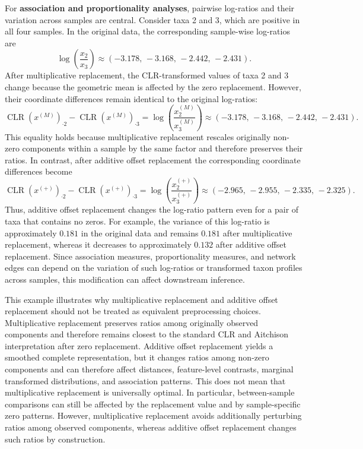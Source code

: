 For \textbf{association and proportionality analyses}, pairwise log-ratios and their variation across samples are central. Consider taxa 2 and 3, which are positive in all four samples. In the original data, the corresponding sample-wise log-ratios are
\begin{equation}
\log\left(\frac{x_2}{x_3}\right)
\approx
(-3.178,\,-3.168,\,-2.442,\,-2.431).
\label{eq:2micro:original_logratio_taxa23_example}
\end{equation}
After multiplicative replacement, the CLR-transformed values of taxa 2 and 3 change because the geometric mean is affected by the zero replacement. However, their coordinate differences remain identical to the original log-ratios:
\begin{equation}
\operatorname{CLR}(x^{(M)})_{\cdot 2}
-
\operatorname{CLR}(x^{(M)})_{\cdot 3}
=
\log\left(\frac{x_2^{(M)}}{x_3^{(M)}}\right)
\approx
(-3.178,\,-3.168,\,-2.442,\,-2.431).
\label{eq:2micro:mult_replacement_logratio_taxa23_example}
\end{equation}
This equality holds because multiplicative replacement rescales originally non-zero components within a sample by the same factor and therefore preserves their ratios. In contrast, after additive offset replacement the corresponding coordinate differences become
\begin{equation}
\operatorname{CLR}(x^{(+)})_{\cdot 2}
-
\operatorname{CLR}(x^{(+)})_{\cdot 3}
=
\log\left(\frac{x_2^{(+)}}{x_3^{(+)}}\right)
\approx
(-2.965,\,-2.955,\,-2.335,\,-2.325).
\label{eq:2micro:additive_offset_logratio_taxa23_example}
\end{equation}
Thus, additive offset replacement changes the log-ratio pattern even for a pair of taxa that contains no zeros. For example, the variance of this log-ratio is approximately $0.181$ in the original data and remains $0.181$ after multiplicative replacement, whereas it decreases to approximately $0.132$ after additive offset replacement. Since association measures, proportionality measures, and network edges can depend on the variation of such log-ratios or transformed taxon profiles across samples, this modification can affect downstream inference.


This example illustrates why multiplicative replacement and additive offset replacement should not be treated as equivalent preprocessing choices. Multiplicative replacement preserves ratios among originally observed components and therefore remains closest to the standard CLR and Aitchison interpretation after zero replacement. Additive offset replacement yields a smoothed complete representation, but it changes ratios among non-zero components and can therefore affect distances, feature-level contrasts, marginal transformed distributions, and association patterns. This does not mean that multiplicative replacement is universally optimal. In particular, between-sample comparisons can still be affected by the replacement value and by sample-specific zero patterns. However, multiplicative replacement avoids additionally perturbing ratios among observed components, whereas additive offset replacement changes such ratios by construction.

